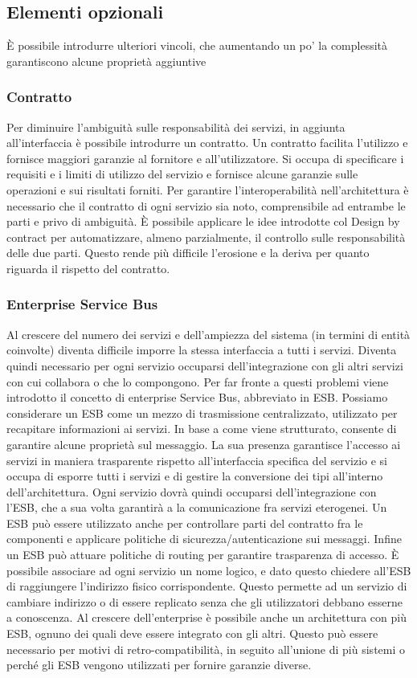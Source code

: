 \documentclass[12pt]{report}
\begin{document}
\subsection{Elementi opzionali} 
È possibile introdurre ulteriori vincoli, che aumentando un po' la complessità garantiscono alcune proprietà aggiuntive 
\subsubsection{Contratto}
Per diminuire l'ambiguità sulle responsabilità dei servizi, in aggiunta all'interfaccia è possibile introdurre un contratto.
Un contratto facilita l'utilizzo e fornisce maggiori garanzie al fornitore e all'utilizzatore.
Si occupa di specificare i requisiti e i limiti di utilizzo del servizio e fornisce alcune garanzie sulle operazioni e sui risultati forniti.
Per garantire l'interoperabilità nell'architettura è necessario che il contratto di ogni servizio sia noto, comprensibile ad entrambe le parti e privo di ambiguità.
È possibile applicare le idee introdotte col Design by contract \cite{meyer1992applying} per automatizzare, almeno parzialmente, il controllo sulle responsabilità delle due parti. 
Questo rende più difficile l'erosione e la deriva per quanto riguarda il rispetto del contratto. 
\subsubsection{Enterprise Service Bus}
Al crescere del numero dei servizi e dell'ampiezza del sistema (in termini di entità coinvolte) diventa difficile imporre la stessa interfaccia a tutti i servizi.
Diventa quindi necessario per ogni servizio occuparsi dell'integrazione con gli altri servizi con cui collabora o che lo compongono.
Per far fronte a questi problemi viene introdotto il concetto di enterprise Service Bus, abbreviato in ESB. 
Possiamo considerare un ESB come un mezzo di trasmissione centralizzato, utilizzato per recapitare informazioni ai servizi. 
In base a come viene strutturato, consente di garantire alcune proprietà sul messaggio.
La sua presenza garantisce l'accesso ai servizi in maniera trasparente rispetto all'interfaccia specifica del servizio e si occupa di esporre tutti i servizi e di gestire la conversione dei tipi all'interno dell'architettura. 
Ogni servizio dovrà quindi occuparsi dell'integrazione con l'ESB, che a sua volta garantirà a la comunicazione fra servizi eterogenei.
Un ESB può essere utilizzato anche per controllare parti del contratto fra le componenti e applicare politiche di sicurezza/autenticazione sui messaggi.
Infine un ESB può attuare politiche di routing per garantire trasparenza di accesso. 
È possibile associare ad ogni servizio un nome logico, e dato questo chiedere all'ESB
di raggiungere l'indirizzo fisico corrispondente.
Questo permette ad un servizio di cambiare indirizzo o di essere replicato senza che gli utilizzatori debbano esserne a conoscenza. 
Al crescere dell'enterprise è possibile anche un architettura con più ESB, ognuno dei quali deve essere integrato con gli altri. 
Questo può essere necessario per motivi di retro-compatibilità, in seguito all'unione di più sistemi o perché gli ESB vengono utilizzati per fornire garanzie diverse.
\end{document}
